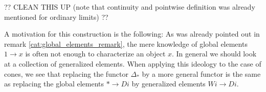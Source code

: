     ?? CLEAN THIS UP (note that continuity and pointwise definition was already mentioned for ordinary limits) ??


    \begin{remark}
        A motivation for this construction is the following: As was already pointed out in remark \ref{cat:global_elements_remark}, the mere knowledge of global elements $1\rightarrow x$ is often not enough to characterize an object $x$. In general we should look at a collection of generalized elements. When applying this ideology to the case of cones, we see that replacing the functor $\Delta_\ast$ by a more general functor is the same as replacing the global elements $\ast\rightarrow Di$ by generalized elements $Wi\rightarrow Di$.
    \end{remark}

